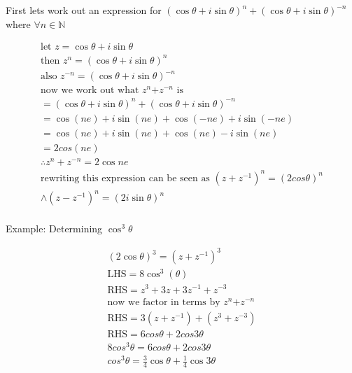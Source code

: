 First lets work out an expression for $(\cos{\theta}+i\sin{\theta})^n+ (\cos{\theta}+i\sin{\theta})^{-n}$ where $\forall{n} \in \mathbb{N}$ 

\begin{equation}
    \begin{split}
        \text{let $z=\cos{\theta}+i\sin{\theta}$} \\
        \text{then $z^n=(\cos{\theta}+i\sin{\theta})^n$} \\
        \text{also $z^{-n}=(\cos{\theta}+i\sin{\theta})^{-n}$} \\                            
        \text{now we work out what $z^n$+$z^{-n}$ is} \\
        = (\cos{\theta}+i\sin{\theta})^n+ (\cos{\theta}+i\sin{\theta})^{-n} \\        
        = \cos{(ne)}+i\sin{(ne)}+\cos{(-ne)}+i\sin{(-ne)} \\
        = \cos{(ne)}+i\sin{(ne)}+\cos{(ne)}-i\sin{(ne)} \\
        = 2cos{(ne)} \\
        \therefore z^{n}+z^{-n} = 2\cos{ne} \\
        \text{rewriting this expression can be seen as $(z+z^{-1})^n = (2cos\theta)^n$}\\        
        \land (z-z^{-1})^n = (2i\sin{\theta})^n \\ 
    \end{split}
\end{equation}

Example: Determining $\cos^3{\theta}$

\begin{equation}
    \begin{split}
        (2\cos{\theta})^3 = (z+z^{-1})^3 \\
        \text{LHS} = 8\cos^3{(\theta)} \\
        \text{RHS} = z^3+3z+3z^{-1}+z^{-3} \\
        \text{now we factor in terms by $z^n$+$z^{-n}$} \\ 
        \text{RHS} = 3(z+z^{-1}) + (z^{3}+z^{-3}) \\
        \text{RHS} = 6cos{\theta}+2cos{3\theta} \\
        8cos^{3}\theta = 6cos{\theta}+2cos{3\theta} \\
        cos^{3}\theta = \frac{3}{4}\cos{\theta}+\frac{1}{4}\cos{3\theta} \\
    \end{split}
\end{equation}

